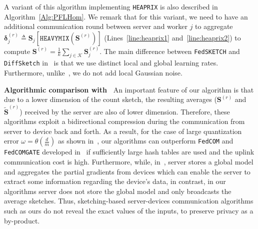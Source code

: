 \documentclass[11pt]{article}
\begin{document}
A variant of this algorithm implementing \texttt{HEAPRIX} is also described in Algorithm~\ref{Alg:PFLHom}. 
We remark that for this variant, we need to have an additional communication round between server and worker $j$ to aggregate $\mathbf{\delta}_j^{(r)}\triangleq \mathbf{S}_j\left[\texttt{HEAVYMIX}(\mathbf{S}^{(r)})\right]$ (Lines~\ref{line:heaprix1} and~\ref{line:heaprix2}) to compute $ {\mathbf{S}}^{(r)}=\frac{1}{k}\sum_{j\in\mathcal{K}}\mathbf{S}^{(r)}_{j}$. The main difference between  \texttt{FedSKETCH} and \texttt{DiffSketch}  in~\cite{li2019privacy} is that we use distinct local and global learning rates. Furthermore, unlike~\cite{li2019privacy}, we do not add local Gaussian noise. 




\noindent\textbf{Algorithmic comparison  with~\cite{haddadpour2020federated}}
An important feature of our algorithm is that due to a lower dimension of the count sketch, the resulting averages ($\mathbf{S}^{(r)}$ and  $\tilde{\mathbf{S}}^{(r)}$) received by the server are also of lower dimension. 
Therefore, these algorithms exploit a bidirectional compression during the communication from server to device back and forth. 
As a result, for the case of large quantization error $\omega=\theta(\frac{d}{m})$ as shown in~\cite{haddadpour2020federated}, our algorithms can outperform \texttt{FedCOM} and \texttt{FedCOMGATE} developed in~\cite{haddadpour2020federated} if sufficiently large hash tables are used and the uplink communication cost is high. 
Furthermore, while, in~\cite{haddadpour2020federated}, server stores a global model and aggregates the partial gradients from devices which can enable the server to extract some information regarding the device's data, in contrast, in our algorithms server does not store the global model and only broadcasts the average sketches. 
Thus, sketching-based server-devices communication algorithms such as ours do not reveal the exact values of the inputs, to preserve privacy as a by-product.
\end{document}

